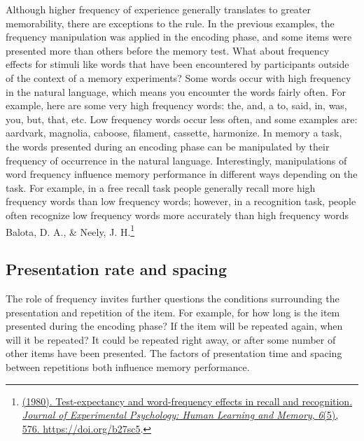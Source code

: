 \documentclass[
  oneside,
  12pt]{crumpbook}
\begin{document}
Although higher frequency of experience generally translates to greater memorability, there are exceptions to the rule. In the previous examples, the frequency manipulation was applied in the encoding phase, and some items were presented more than others before the memory test. What about frequency effects for stimuli like words that have been encountered by participants outside of the context of a memory experiments? Some words occur with high frequency in the natural language, which means you encounter the words fairly often. For example, here are some very high frequency words: the, and, a to, said, in, was, you, but, that, etc. Low frequency words occur less often, and some examples are: aardvark, magnolia, caboose, filament, cassette, harmonize. In memory a task, the words presented during an encoding phase can be manipulated by their frequency of occurrence in the natural language. Interestingly, manipulations of word frequency influence memory performance in different ways depending on the task. For example, in a free recall task people generally recall more high frequency words than low frequency words; however, in a recognition task, people often recognize low frequency words more accurately than high frequency words Balota, D. A., \& Neely, J. H.\footnote{\protect\hyperlink{ref-balotaTestexpectancyWordfrequencyEffects1980}{(1980). Test-expectancy and word-frequency effects in recall and recognition. \emph{Journal of Experimental Psychology: Human Learning and Memory}, \emph{6}(5), 576. \url{https://doi.org/b27sc5}}.}

\hypertarget{presentation-rate-and-spacing}{%
\subsection{Presentation rate and spacing}\label{presentation-rate-and-spacing}}

The role of frequency invites further questions the conditions surrounding the presentation and repetition of the item. For example, for how long is the item presented during the encoding phase? If the item will be repeated again, when will it be repeated? It could be repeated right away, or after some number of other items have been presented. The factors of presentation time and spacing between repetitions both influence memory performance.
\end{document}
